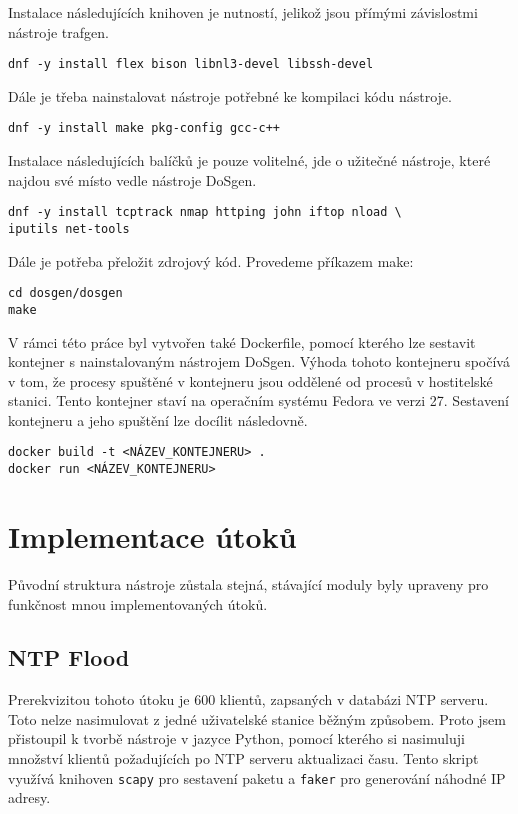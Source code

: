 \noindent Instalace následujících knihoven je nutností, jelikož jsou přímými závislostmi nástroje trafgen.
\begin{lstlisting}
dnf -y install flex bison libnl3-devel libssh-devel
\end{lstlisting}

\noindent Dále je třeba nainstalovat nástroje potřebné ke kompilaci kódu nástroje.
\begin{lstlisting}
dnf -y install make pkg-config gcc-c++
\end{lstlisting}

\noindent Instalace následujících balíčků je pouze volitelné, jde o užitečné nástroje, které najdou své místo vedle nástroje DoSgen.
\begin{lstlisting}
dnf -y install tcptrack nmap httping john iftop nload \
iputils net-tools
\end{lstlisting}

\noindent Dále je potřeba přeložit zdrojový kód. Provedeme příkazem make:
\begin{lstlisting}
cd dosgen/dosgen
make
\end{lstlisting}

V rámci této práce byl vytvořen také Dockerfile, pomocí kterého lze sestavit kontejner s nainstalovaným nástrojem DoSgen. Výhoda tohoto kontejneru spočívá v tom, že procesy spuštěné v kontejneru jsou oddělené od procesů v hostitelské stanici. Tento kontejner staví na operačním systému Fedora ve verzi 27. Sestavení kontejneru a jeho spuštění lze docílit následovně.
\begin{lstlisting}
docker build -t <NÁZEV_KONTEJNERU> .
docker run <NÁZEV_KONTEJNERU>
\end{lstlisting}

\section{Implementace útoků}
Původní struktura nástroje zůstala stejná, stávající moduly byly upraveny pro funkčnost mnou implementovaných útoků.

\subsection{NTP Flood}

Prerekvizitou tohoto útoku je 600 klientů, zapsaných v databázi NTP serveru. Toto nelze nasimulovat z jedné uživatelské stanice běžným způsobem. Proto jsem přistoupil k tvorbě nástroje v jazyce Python, pomocí kterého si nasimuluji množství klientů požadujících po NTP serveru aktualizaci času. Tento skript využívá knihoven \texttt{scapy} pro sestavení paketu a \texttt{faker} pro generování náhodné IP adresy.

